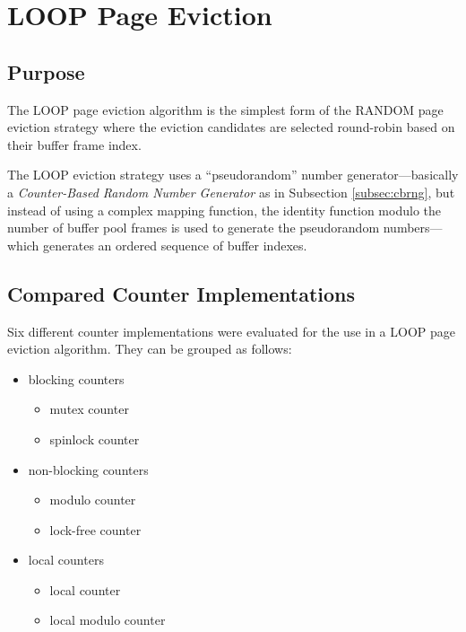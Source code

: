 \chapter[LOOP Page Eviction]{LOOP Page Eviction} \label{ch:loop}

\section[Purpose]{Purpose}

    The LOOP page eviction algorithm is the simplest form of the RANDOM page eviction strategy where the eviction candidates are selected round-robin based on their buffer frame index.

    The LOOP eviction strategy uses a ``pseudorandom'' number generator---basically a \emph{Counter-Based Random Number Generator} as in Subsection \ref{subsec:cbrng}, but instead of using a complex mapping function, the identity function modulo the number of buffer pool frames is used to generate the pseudorandom numbers--- which generates an ordered sequence of buffer indexes.

\section[Compared Counter Implementations]{Compared Counter Implementations}

    Six different counter implementations were evaluated for the use in a LOOP page eviction algorithm. They can be grouped as follows:

\begin{@empty}
    \begin{itemize}
        \itemsep0em
        \item blocking counters
              \begin{itemize}
              \itemsep0em
                  \item mutex counter
                  \item spinlock counter
              \end{itemize}
        \item non-blocking counters
              \begin{itemize}
                  \itemsep0em
                  \item modulo counter
                  \item lock-free counter
              \end{itemize}
        \item local counters
              \begin{itemize}
                  \itemsep0em
                  \item local counter
                  \item local modulo counter
              \end{itemize}
    \end{itemize}
\end{@empty}


